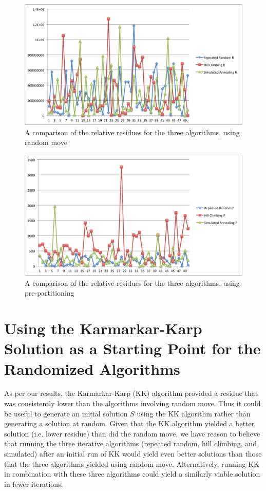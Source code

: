 \documentclass[12pt]{article}
\begin{document}
\begin{figure}
\caption{A comparison of the relative residues for the three algorithms, using random move}
\includegraphics[scale=0.6]{rm_graph.png}
\centering
\end{figure}
\begin{figure}
\caption{A comparison of the relative residues for the three algorithms, using pre-partitioning}
\includegraphics[scale=0.6]{pp_graph.png}
\centering
\end{figure}

\section{Using the Karmarkar-Karp Solution as a Starting Point for the Randomized Algorithms}
As per our results, the Karmarkar-Karp (KK) algorithm provided a residue that was consistently lower than the algorithms involving random move.  Thus it could be useful to generate an initial solution $S$ using the KK algorithm rather than generating a solution at random.  Given that the KK algorithm yielded a better solution (i.e. lower residue) than did the random move, we have reason to believe that running the three iterative algorithms (repeated random, hill climbing, and simulated) after an initial run of KK would yield even better solutions than those that the three algorithms yielded using random move.  Alternatively, running KK in combination with these three algorithms could yield a similarly viable solution in fewer iterations.\\
\end{document}
